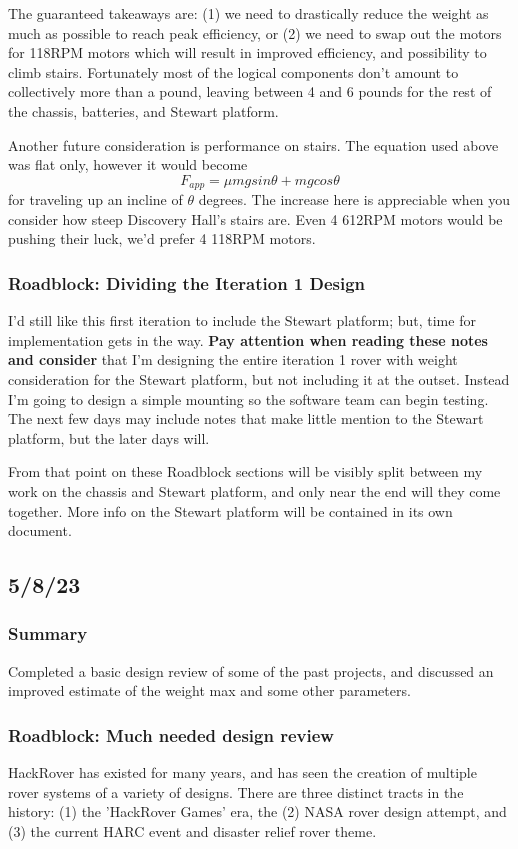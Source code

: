 \documentclass[a4paper, 10pt]{article}
\begin{document}
		The guaranteed takeaways are: (1) we need to drastically reduce the weight as much as possible to reach peak efficiency, or (2) we need to swap out the motors for 118RPM motors which will result in improved efficiency, and possibility to climb stairs. Fortunately most of the logical components don't amount to collectively more than a pound, leaving between 4 and 6 pounds for the rest of the chassis, batteries, and Stewart platform. 
	
		Another future consideration is performance on stairs. The equation used above was flat only, however it would become 
		$$F_{app} = \mu mgsin\theta + mgcos\theta$$
		for traveling up an incline of $\theta$ degrees. The increase here is appreciable when you consider how steep Discovery Hall's stairs are. Even 4 612RPM motors would be pushing their luck, we'd prefer 4 118RPM motors. 
	
		\subsubsection{Roadblock: Dividing the Iteration 1 Design}
		I'd still like this first iteration to include the Stewart platform; but, time for implementation gets in the way. \textbf{Pay attention when reading these notes and consider} that I'm designing the entire iteration 1 rover with weight consideration for the Stewart platform, but not including it at the outset. Instead I'm going to design a simple mounting so the software team can begin testing. The next few days may include notes that make little mention to the Stewart platform, but the later days will. 
		
		From that point on these Roadblock sections will be visibly split between my work on the chassis and Stewart platform, and only near the end will they come together. More info on the Stewart platform will be contained in its own document.

		
	\subsection{5/8/23}
		\subsubsection{Summary}
		Completed a basic design review of some of the past projects, and discussed an improved estimate of the weight max and some other parameters.
		
		\subsubsection{Roadblock: Much needed design review}
		HackRover has existed for many years, and has seen the creation of multiple rover systems of a variety of designs. There are three distinct tracts in the history: (1) the 'HackRover Games' era, the (2) NASA rover design attempt, and (3) the current HARC event and disaster relief rover theme.
		
\end{document}
